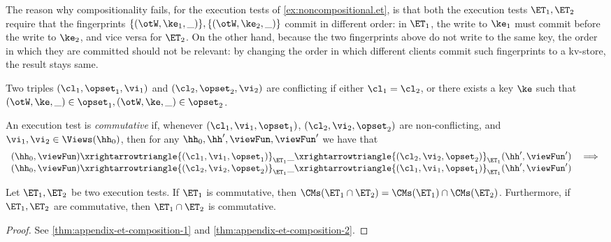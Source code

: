 The reason why compositionality fails, for the execution tests of \cref{ex:noncompositional.et}, 
is that both the execution tests $\ET_1, \ET_2$ require that the fingerprints 
$\{(\otW, \ke_1, \_)\}, \{(\otW, \ke_2, \_)\}$ commit in different order: in $\ET_1$, the write to $\ke_1$ must commit 
before the write to $\ke_2$, and vice versa for $\ET_2$. On the other hand, 
because the two fingerprints above do not write to the same key, 
the order in which they are committed should not be relevant: by changing the order 
in which different clients commit such fingerprints to a kv-store, the result stays same. 
\begin{definition}
Two triples $(\cl_1, \opset_1, \vi_1)$ and $(\cl_2, \opset_2, \vi_2)$ are 
conflicting if either $\cl_1 = \cl_2$, or there exists a key $\ke$ such that 
$(\otW, \ke, \_) \in \opset_1, (\otW, \ke, \_) \in \opset_2$. 

An execution test is \emph{commutative} if, whenever $(\cl_1, \vi_1, \opset_1)$, 
$(\cl_2, \vi_2, \opset_2)$ are non-conflicting, and $\vi_1, \vi_2 \in \Views(\hh_0)$,  
then for any $\hh_0, \hh', \viewFun, \viewFun'$ we have that 
\[
\begin{array}{lr}
(\hh_0, \viewFun) \xrightarrowtriangle{(\cl_1, \vi_1, \opset_1)}_{\ET_1} 
\_ \xrightarrowtriangle{(\cl_2, \vi_2, \opset_2)}_{\ET_1} (\hh', \viewFun') &\implies \\
(\hh_0, \viewFun) \xrightarrowtriangle{(\cl_2, \vi_2, \opset_2)}_{\ET_1} 
\_ \xrightarrowtriangle{(\cl_1, \vi_1, \opset_1)}_{\ET_1} (\hh', \viewFun')
\end{array}
\]
\end{definition}

\begin{theorem}
Let $\ET_1, \ET_2$ be two execution tests. If $\ET_1$ is commutative, 
then $\CMs(\ET_1 \cap \ET_2) = \CMs(\ET_1) \cap \CMs(\ET_2)$. 
Furthermore, if $\ET_1, \ET_2$ are commutative, then $\ET_1 \cap \ET_2$ 
is commutative.
\end{theorem}
\begin{proof}
See \cref{thm:appendix-et-composition-1} and \cref{thm:appendix-et-composition-2}.
\end{proof}



